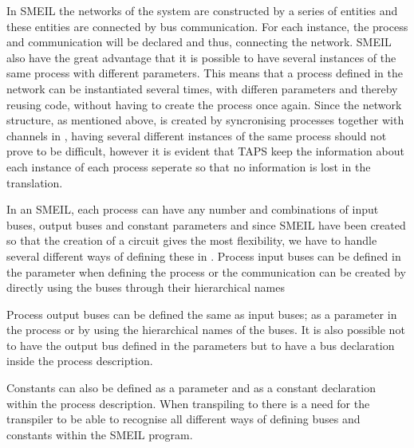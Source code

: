 In SMEIL the networks of the system are constructed by a series of entities and these entities are connected by bus communication. For each instance, the process and communication will be declared and thus, connecting the network. SMEIL also have the great advantage that it is possible to have several instances of the same process with different parameters. This means that a process defined in the network can be instantiated several times, with differen parameters and thereby reusing code, without having to create the process once again. Since the network structure, as mentioned above, is created by syncronising processes together with channels in \cspm, having several different instances of the same process should not prove to be difficult, however it is evident that TAPS keep the information about each instance of each process seperate so that no information is lost in the translation.




In an SMEIL, each process can have any number and combinations of input buses, output buses and constant parameters and since SMEIL have been created so that the creation of a circuit gives the most flexibility, we have to handle several different ways of defining these in \cspm.
Process input buses can be defined in the parameter when defining the process or the communication can be created by directly using the buses through their hierarchical names %

Process output buses can be defined the same as input buses; as a parameter in the process or by using the hierarchical names of the buses. It is also possible not to have the output bus defined in the parameters but to have a bus declaration inside the process description.



Constants can also be defined as a parameter and as a constant declaration within the process description. %
When transpiling to \cspm there is a need for the transpiler to be able to recognise all different ways of defining buses and constants within the SMEIL program.

